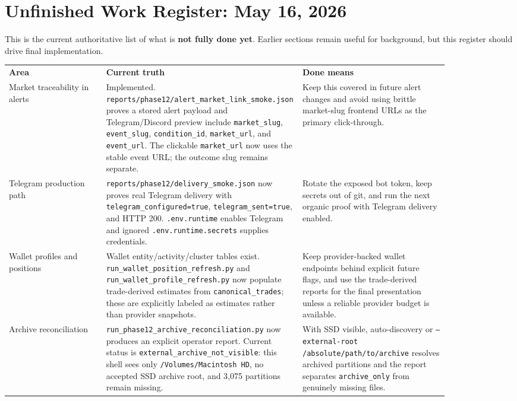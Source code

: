\documentclass{article}
\begin{document}
\section*{Unfinished Work Register: May 16, 2026}
This is the current authoritative list of what is \textbf{not fully done yet}. Earlier sections remain useful for background, but this register should drive final implementation.

\begin{longtable}{p{0.22\linewidth}p{0.31\linewidth}p{0.33\linewidth}}
\textbf{Area} & \textbf{Current truth} & \textbf{Done means} \\
Market traceability in alerts & Implemented. \texttt{reports/phase12/alert\_market\_link\_smoke.json} proves a stored alert payload and Telegram/Discord preview include \texttt{market\_slug}, \texttt{event\_slug}, \texttt{condition\_id}, \texttt{market\_url}, and \texttt{event\_url}. The clickable \texttt{market\_url} now uses the stable event URL; the outcome slug remains separate. & Keep this covered in future alert changes and avoid using brittle market-slug frontend URLs as the primary click-through. \\
Telegram production path & \texttt{reports/phase12/delivery\_smoke.json} now proves real Telegram delivery with \texttt{telegram\_configured=true}, \texttt{telegram\_sent=true}, and HTTP 200. \texttt{.env.runtime} enables Telegram and ignored \texttt{.env.runtime.secrets} supplies credentials. & Rotate the exposed bot token, keep secrets out of git, and run the next organic proof with Telegram delivery enabled. \\
Wallet profiles and positions & Wallet entity/activity/cluster tables exist. \texttt{run\_wallet\_position\_refresh.py} and \texttt{run\_wallet\_profile\_refresh.py} now populate trade-derived estimates from \texttt{canonical\_trades}; these are explicitly labeled as estimates rather than provider snapshots. & Keep provider-backed wallet endpoints behind explicit future flags, and use the trade-derived reports for the final presentation unless a reliable provider budget is available. \\
Archive reconciliation & \texttt{run\_phase12\_archive\_reconciliation.py} now produces an explicit operator report. Current status is \texttt{external\_archive\_not\_visible}: this shell sees only \texttt{/Volumes/Macintosh HD}, no accepted SSD archive root, and 3{,}075 partitions remain missing. & With SSD visible, auto-discovery or \texttt{--external-root /absolute/path/to/archive} resolves archived partitions and the report separates \texttt{archive\_only} from genuinely missing files. \\

\end{longtable}
\end{document}
